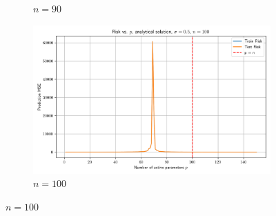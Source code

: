 \documentclass{article}
\begin{document}
\begin{figure}[htb]
\begin{subfigure}[b]{\imgwidth}
    \caption{$n=90$}\label{fig:2g}
  \end{subfigure}%
  \hfill
  \begin{subfigure}[b]{\imgwidth}
    \includegraphics[width=\linewidth]{img2/risk_curve_n100.png}
    \caption{$n=100$}\label{fig:2h}
  \end{subfigure}

  \medskip


\end{figure}
\end{document}
